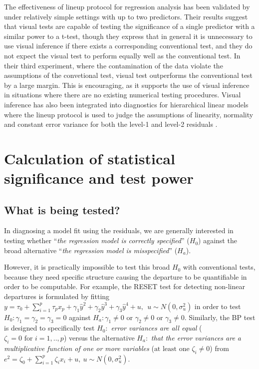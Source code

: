 \documentclass[]{interact}
\theoremstyle{plain}%
\theoremstyle{definition}
\theoremstyle{remark}
\begin{document}
The effectiveness of lineup protocol for regression analysis has been
validated by \citet{majumder2013validation} under relatively simple
settings with up to two predictors. Their results suggest that visual
tests are capable of testing the significance of a single predictor with
a similar power to a t-test, though they express that in general it is
unnecessary to use visual inference if there exists a corresponding
conventional test, and they do not expect the visual test to perform
equally well as the conventional test. In their third experiment, where
the contamination of the data violate the assumptions of the convetional
test, visual test outperforms the conventional test by a large margin.
This is encouraging, as it supports the use of visual inference in
situations where there are no existing numerical testing procedures.
Visual inference has also been integrated into diagnostics for
hierarchical linear models where the lineup protocol is used to judge
the assumptions of linearity, normality and constant error variance for
both the level-1 and level-2 residuals
\citep{loy2013diagnostic, loy2014hlmdiag, loy2015you}.

\hypertarget{significance-calculation}{%
\section{Calculation of statistical significance and test
power}\label{significance-calculation}}

\hypertarget{what-is-being-tested}{%
\subsection{What is being tested?}\label{what-is-being-tested}}

In diagnosing a model fit using the residuals, we are generally
interested in testing whether ``\emph{the regression model is correctly
specified}'' (\(H_0\)) against the broad alternative ``\emph{the
regression model is misspecified}'' (\(H_a\)).

However, it is practically impossible to test this broad \(H_0\) with
conventional tests, because they need specific structure causing the
departure to be quantifiable in order to be computable. For example, the
RESET test for detecting non-linear departures is formulated by fitting
\(y = \tau_0 + \sum_{i=1}^{p}\tau_px_p +\gamma_1\hat{y}^2 + \gamma_2\hat{y}^3 + \gamma_3\hat{y}^4 + u, ~~u \sim N(0, \sigma_u^2)\)
in order to test \(H_0:\gamma_1 = \gamma_2 = \gamma_3 = 0\) against
\(H_a: \gamma_1 \neq 0 \text{ or } \gamma_2 \neq 0 \text{ or } \gamma_3 \neq 0\).
Similarly, the BP test is designed to specifically test \(H_0:\)
\emph{error variances are all equal}
(\(\zeta_i=0 \text{ for } i=1,..,p\)) versus the alternative \(H_a:\)
\emph{that the error variances are a multiplicative function of one or
more variables} (\(\text{at least one } \zeta_i\neq 0\)) from
\(e^2 = \zeta_0 + \sum_{i=1}^{p}\zeta_i x_i + u, ~ u\sim N(0,\sigma_u^2)\).
\end{document}
